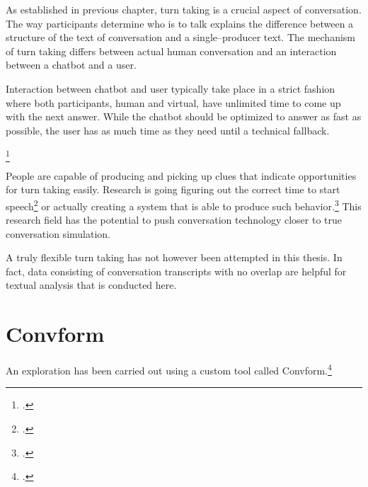 \documentclass[12pt]{report}
\begin{document}
{\par
As established in previous chapter, turn taking is a crucial aspect of conversation.
The way participants determine who is to talk
explains the difference between
a structure of the text of conversation
and a single–producer text.
The mechanism of turn taking differs
between actual human conversation
and an interaction between a chatbot and a user.

Interaction between chatbot and user
typically take place in a strict fashion
where both participants,
human and virtual,
have unlimited time to come up with the next answer.
While the chatbot should be optimized to answer as fast as possible,
the user has as much time as they need until a technical fallback.

\par
{}\footcite{turntaking}

\par
People are capable of producing and picking up clues
that indicate opportunities for turn taking easily.
Research is going
figuring out the correct time to start speech\footcite{turntakingreview,GRAVANO2011601}
or actually creating a system that is able to produce such behavior.\footcite{distributedturntaking,Gervits2020Sigdial}
This research field
has the potential to push conversation technology
closer to true conversation simulation.

\par
A truly flexible turn taking has not however been attempted in this thesis.
In fact, data consisting of conversation transcripts with no overlap
are helpful for textual analysis that is conducted here.

\section{Convform}
\par
An exploration has been carried out using a custom tool called Convform.\footcite{convform}

}
\end{document}
